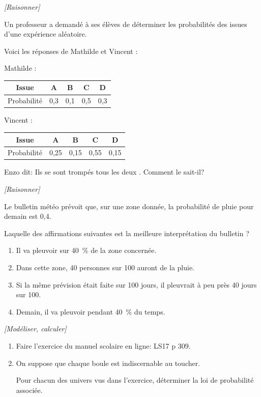 \exo \textit{[Raisonner]}

Un professeur a demandé à ses élèves de déterminer les probabilités des issues d'une expérience aléatoire.

Voici les réponses de Mathilde et Vincent :

Mathilde :

\medskip

\begin{tabular}{*{5}{|c}|}
\hline
Issue &  A & B & C & D  \tabularnewline
\hline
Probabilité & 0,3 & 0,1 & 0,5 & 0,3  \tabularnewline
\hline
\end{tabular}

\medskip

Vincent :

\medskip

\begin{tabular}{*{5}{|c}|}
\hline
Issue &  A & B & C & D  \tabularnewline
\hline
Probabilité & 0,25 & 0,15 & 0,55 & 0,15 \tabularnewline
\hline
\end{tabular}

\medskip

Enzo dit: \og Ils se sont trompés tous les deux \fg{}. Comment le sait-il?

\exo \textit{[Raisonner]}

Le bulletin météo prévoit que, sur une zone donnée, la probabilité de pluie pour demain est 0,4.

Laquelle des affirmations suivantes est la meilleure interprétation du bulletin ?

\begin{enumerate} [label=\Alph*:]
\item Il va pleuvoir sur 40~\% de la zone concernée.
\item Dans cette zone, 40 personnes sur 100 auront de la pluie.
\item Si la même prévision était faite sur 100 jours, il pleuvrait à peu près 40 jours sur 100.
\item Demain, il va pleuvoir pendant 40~\% du temps.
\end{enumerate}

\exo \textit{[Modéliser, calculer]}

\begin{enumerate}
\item Faire l'exercice du manuel scolaire en ligne: LS17 p 309.

\item On suppose que chaque boule est indiscernable au toucher.

Pour chacun des univers vus dans l'exercice, déterminer la loi de probabilité associée.

\end{enumerate}

